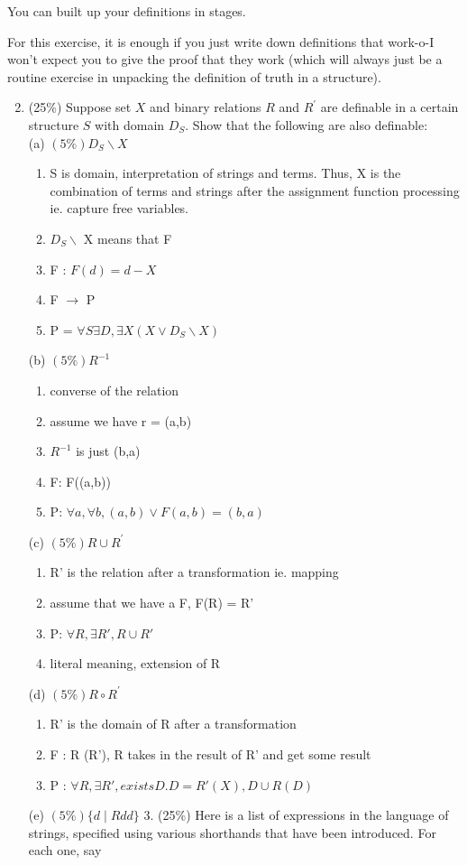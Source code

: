 \documentclass[10pt]{article}
\begin{document}
You can built up your definitions in stages.

For this exercise, it is enough if you just write down definitions that work-o-I won't expect you to give the proof that they work (which will always just be a routine exercise in unpacking the definition of truth in a structure).

\begin{enumerate}
  \setcounter{enumi}{1}
  \item (25\%) Suppose set \(X\) and binary relations \(R\) and \(R^{\prime}\) are definable in a certain structure \(S\) with domain \(D_{S}\). Show that the following are also definable:\\
(a) \((5 \%) D_{S} \backslash X\)\\
\begin{enumerate}
  \item S is domain, interpretation of strings and terms. Thus, X is the combination of terms and strings after the assignment function processing ie. capture free variables. 
  \item $D_{S} \backslash$ X means that F
  \item F : $F(d) = d - X$
  \item F $\rightarrow $ P 
  \item P = $\forall S \exists D, \exists X (X \vee D_{S} \backslash X)$ 
\end{enumerate} 
(b) \((5 \%) R^{-1}\)\\
  \begin{enumerate}
    \item converse of the relation
    \item assume we have r = (a,b)
    \item  $R^{-1}$ is just (b,a)
    \item F: F((a,b))
    \item P: $\forall a, \forall b, (a,b) \vee F(a,b) = (b,a)$
  \end{enumerate}
(c) \((5 \%) R \cup R^{\prime}\)\\
  \begin{enumerate}
    \item R' is the relation after a transformation ie. mapping
    \item assume that we have a F, F(R) = R'
    \item P: $\forall R, \exists R', R \cup R'$
    \item literal meaning, extension of R
  \end{enumerate}
(d) \((5 \%) R \circ R^{\prime}\)\\
\begin{enumerate}
  \item R' is the domain of R after a transformation
  \item F : R (R'), R takes in the result of R' and get some result
  \item P : $\forall R, \exists R', exists D. D = R'(X), D \cup R(D)  $
\end{enumerate}
(e) \((5 \%)\{d \mid R d d\}\) 3. (25\%) Here is a list of expressions in the language of strings, specified using various shorthands that have been introduced. For each one, say
\end{enumerate}
\end{document}
